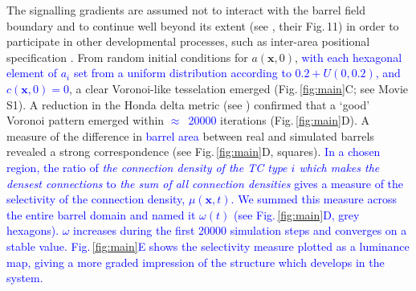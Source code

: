 \documentclass[9pt,lineno,draft]{elife}
\newcommand{\cmnt}[1]{\textcolor{blue}{#1}}
\newcommand{\mpfour}[1]{\textcolor{revgreen}{#1}}
\newcommand{\mb}[1]{\mathbf{#1}}
\begin{document}
\mpfour{The signalling gradients are assumed not to interact with the barrel
  field boundary and to continue well beyond its extent (see
  \citealp{miller_epha7-ephrin-a5_2006}, their Fig.\,11) in order to
  participate in other developmental processes, such as inter-area positional
  specification \citep{sur_patterning_2005,oleary_area_2007}.} %
%
From random initial conditions for $a(\mb{x},0)$, \cmnt{with each hexagonal element
  of $a_i$ set from a uniform distribution according to $0.2+{U}(0,0.2)$, and
  $c(\mb{x},0)=0$}, a clear Voronoi-like tesselation
emerged (Fig.\,\ref{fig:main}C; see Movie S1). A reduction in the Honda delta
metric (see \citealp{senft_mouse_1991}) confirmed that a `good' Voronoi
pattern emerged within \cmnt{$\approx$~20000} iterations
(Fig.\,\ref{fig:main}D).  A measure of the difference in \cmnt{barrel area}
between real and simulated barrels revealed a strong correspondence (see
Fig.\,\ref{fig:main}D, squares). \cmnt{In a chosen region, the ratio of
  \emph{the connection density of the TC type $i$ which makes the densest
    connections} to \emph{the sum of all connection densities} gives a measure
  of the selectivity of the connection density, $\mu(\mb{x},t)$. We summed this measure
  across the entire barrel domain and named it $\omega(t)$ (see
  Fig.\,\ref{fig:main}D, grey hexagons). $\omega$ increases during the first
  20000 simulation steps and converges on a stable
  value. Fig.\,\ref{fig:main}E shows the selectivity measure plotted as a
  luminance map, giving a more graded impression of the structure which
  develops in the system.}
\end{document}
